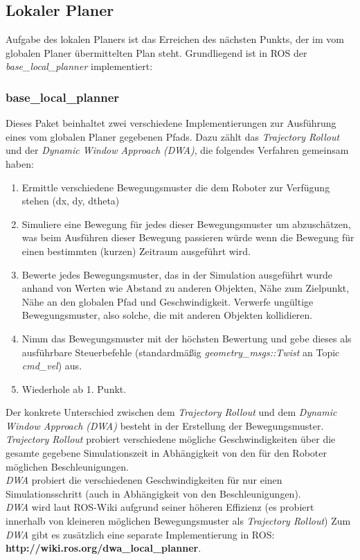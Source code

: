\documentclass[oribibl]{llncs}
\begin{document}
\subsection{Lokaler Planer}
Aufgabe des lokalen Planers ist das Erreichen des nächsten Punkts, der im vom globalen Planer übermittelten Plan steht. Grundliegend ist in ROS der \textit{base\_local\_planner} implementiert: \subsubsection{base\_local\_planner}
Dieses Paket beinhaltet zwei verschiedene Implementierungen zur Ausführung eines vom globalen Planer gegebenen Pfads. Dazu zählt das \textit{Trajectory Rollout} und der \textit{Dynamic Window Approach (DWA)}, die folgendes Verfahren gemeinsam haben:
\begin{enumerate}	
\item Ermittle verschiedene Bewegungsmuster die dem Roboter zur Verfügung stehen (dx, dy, dtheta)
\item Simuliere eine Bewegung für jedes dieser Bewegungsmuster um abzuschätzen, was beim Ausführen dieser Bewegung passieren würde wenn die Bewegung für einen bestimmten (kurzen) Zeitraum ausgeführt wird.
\item Bewerte jedes Bewegungsmuster, das in der Simulation ausgeführt wurde anhand von Werten wie Abstand zu anderen Objekten, Nähe zum Zielpunkt, Nähe an den globalen Pfad und Geschwindigkeit. Verwerfe ungültige Bewegungsmuster, also solche, die mit anderen Objekten kollidieren.
\item Nimm das Bewegungsmuster mit der höchsten Bewertung und gebe dieses als ausführbare Steuerbefehle (standardmäßig \textit{geometry\_msgs::Twist} an Topic \textit{cmd\_vel}) aus.
\item Wiederhole ab 1. Punkt.
\end{enumerate}

Der konkrete Unterschied zwischen dem \textit{Trajectory Rollout} und dem \textit{Dynamic Window Approach (DWA)} besteht in der Erstellung der Bewegungsmuster.\\
\textit{Trajectory Rollout} probiert verschiedene mögliche Geschwindigkeiten über die gesamte gegebene Simulationszeit in Abhängigkeit von den für den Roboter möglichen Beschleunigungen.\\
\textit{DWA} probiert die verschiedenen Geschwindigkeiten für nur einen Simulationsschritt (auch in Abhängigkeit von den Beschleunigungen).\\
\textit{DWA} wird laut ROS-Wiki aufgrund seiner höheren Effizienz (es probiert innerhalb von kleineren möglichen Bewegungsmuster als \textit{Trajectory Rollout}) \cite{baseLocalPlanner}
Zum \textit{DWA} gibt es zusätzlich eine separate Implementierung in ROS:\\ \textbf{http://wiki.ros.org/dwa\_local\_planner}.
\end{document}
